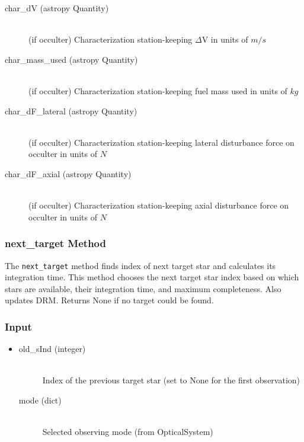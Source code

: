 \documentclass[cleanfoot]{asme2ej}
\begin{document}
\begin{itemize}
\begin{description}
\begin{description}
        \item[char\_dV (astropy Quantity)] \hfill \\ (if occulter) Characterization station-keeping $\Delta$V in units of $ m/s $
        \item[char\_mass\_used (astropy Quantity)] \hfill \\ (if occulter) Characterization station-keeping fuel mass used in units of $ kg $
        \item[char\_dF\_lateral (astropy Quantity)] \hfill \\ (if occulter) Characterization station-keeping lateral disturbance force on occulter in units of $ N $
        \item[char\_dF\_axial (astropy Quantity)] \hfill \\ (if occulter) Characterization station-keeping axial disturbance force on occulter in units of $ N $
    \end{description}
\end{description}
\end{itemize}

\subsubsection{next\_target Method} \label{sec:nexttargettask}
The \verb+next_target+ method finds index of next target star and calculates its integration time. This method chooses the next target star index based on which stars are available, their integration time, and maximum completeness. Also updates DRM. Returns None if no target could be found.

\subsubsection*{Input}
\begin{itemize}
\item 
\begin{description}
    \item[old\_sInd (integer)] \hfill \\ Index of the previous target star (set to None for the first observation)
    \item[mode (dict)] \hfill \\ Selected observing mode (from OpticalSystem)
\end{description}
\end{itemize}
\end{document}
